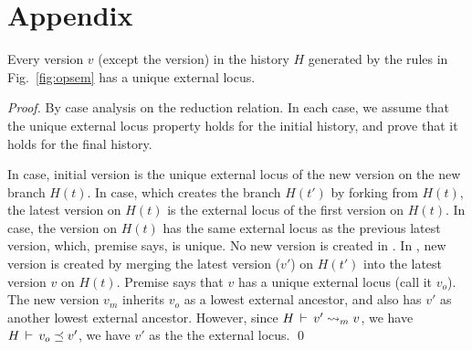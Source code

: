 \section{Appendix}

\begin{lemma} 
Every version $v$ (except the  version) in the history $H$
generated by the rules in Fig.~\ref{fig:opsem} has a unique external
locus.
\end{lemma}
\begin{proof}
By case analysis on the reduction relation. In each case, we assume
that the unique external locus property holds for the initial history,
and prove that it holds for the final history.

In  case, initial version is the unique external locus of
the new version on the new branch $H(t)$. In  case,
which creates the branch $H(t')$ by forking from $H(t)$, the latest
version on $H(t)$ is the external locus of the first version on
$H(t)$. In  case, the version on $H(t)$ has the same
external locus as the previous latest version, which, premise says, is
unique. No new version is created in . In
, new version is created by merging the latest
version ($v'$) on $H(t')$ into the latest version $v$ on $H(t)$.
Premise says that $v$ has a unique external locus (call it $v_o$). The
new version $v_m$ inherits $v_o$ as a lowest external ancestor, and
also has $v'$ as another lowest external ancestor. However, since
$H\,\vdash\,v' \rightsquigarrow_m v$, we have $H\,\vdash\,v_o \preceq v'$, we
have $v'$ as the the external locus.
\qed
\end{proof}

